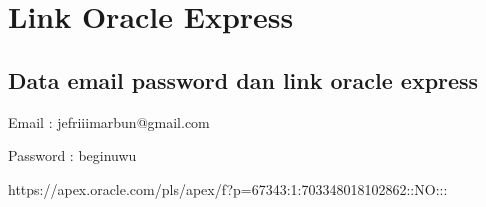 \chapter*{Link Oracle Express}
\section*{Data email password dan link oracle express} 


\item Email : jefriiimarbun@gmail.com
\item Password : beginuwu
\item https://apex.oracle.com/pls/apex/f?p=67343:1:703348018102862::NO:::

	
	
	
